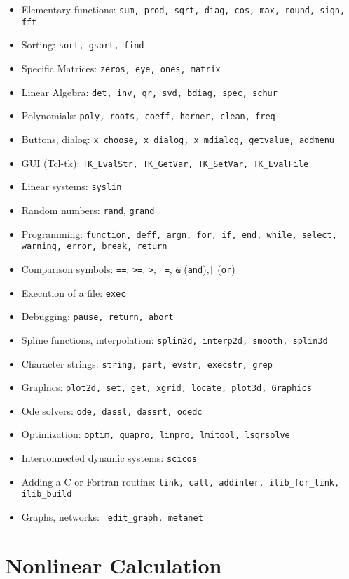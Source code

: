 \begin{itemize}
\item{Elementary functions: {\tt sum, prod, sqrt, diag, cos, max, round, sign, fft}}
\item{Sorting: {\tt sort, gsort, find}}
\item{Specific Matrices: {\tt zeros, eye, ones, matrix}}
\item{Linear Algebra: {\tt det, inv, qr, svd, bdiag, spec, schur}}
\item{Polynomials}: {\tt poly, roots, coeff, horner, clean, freq}
\item{Buttons, dialog: \verb!x_choose, x_dialog, x_mdialog, getvalue, addmenu!}
\item{GUI (Tcl-tk): \verb!TK_EvalStr, TK_GetVar, TK_SetVar, TK_EvalFile!}
\item{Linear systems: {\tt syslin}}
\item{Random numbers: {\tt rand}, {\tt grand}}
\item{Programming: {\tt function, deff, argn, for, if, end, while, 
select, warning, error, break, return}}
\item{Comparison symbols: {\tt ==}, {\tt >=}, {\tt >}, {\tt ~=}, {\verb!&!}
({\tt and}),{\tt |} ({\tt or})}
\item{Execution of a file: {\tt exec}}
\item{Debugging: {\tt pause, return, abort}}
\item{Spline functions, interpolation: {\tt splin2d, interp2d, smooth, splin3d}}
\item{Character strings: {\tt string, part, evstr, execstr, grep}}
\item{Graphics: {\tt plot2d, set, get, xgrid, locate, plot3d, Graphics}}
\item{Ode solvers: {\tt ode, dassl, dassrt, odedc}}
\item{Optimization: {\tt optim, quapro, linpro, lmitool, lsqrsolve}}
\item{Interconnected dynamic systems: {\tt scicos}}
\item{Adding a C or Fortran routine: {\verb!link, call, addinter, ilib_for_link, ilib_build!}}
\item{Graphs, networks: {\verb! edit_graph, metanet!}}
\end{itemize}


\section{Nonlinear Calculation}
\label{ch6}

